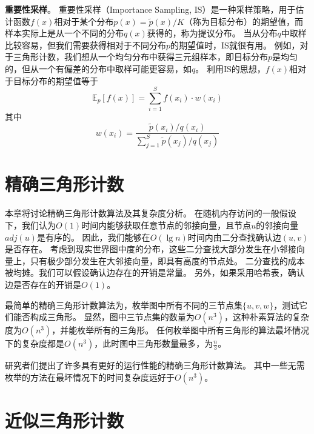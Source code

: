 \textbf{重要性采样}。
重要性采样（Importance Sampling, IS）是一种采样策略，用于估计函数$f(x)$相对于某个分布$p(x)=\tilde{p}(x)/K$（称为目标分布）的期望值，而样本实际上是从一个不同的分布$q(x)$获得的，称为提议分布。
当从分布$q$中取样比较容易，但我们需要获得相对于不同分布$p$的期望值时，IS就很有用。
例如，对于三角形计数，我们想从一个均匀分布中获得三元组样本，即目标分布$p$是均匀的，但从一个有偏差的分布中取样可能更容易，如$q$。
利用IS的思想，$f(x)$相对于目标分布的期望值等于
\begin{equation}
    \mathbb{E}_{p}[f(x)]=\sum_{i=1}^{S} f\left(x_{i}\right) \cdot w\left(x_{i}\right)
    \label{eq:IS}
\end{equation}
其中
\begin{equation}
    w\left(x_{i}\right)=\frac{\widetilde{p}\left(x_{i}\right) / q\left(x_{i}\right)}{\sum_{j=1}^{S} \tilde{p}\left(x_{j}\right) / q\left(x_{j}\right)}
\end{equation}


\chapter{精确三角形计数}
本章将讨论精确三角形计数算法及其复杂度分析。
在随机内存访问的一般假设下，我们认为$O(1)$时间内能够获取任意节点的邻接向量，且节点$u$的邻接向量$adj(u)$是有序的。
因此，我们能够在$O(\lg n)$时间内由二分查找确认边$(u,v)$是否存在。
考虑到现实世界图中度的分布，这些二分查找大部分发生在小邻接向量上，只有极少部分发生在大邻接向量，即具有高度的节点处。
二分查找的成本被均摊。我们可以假设确认边存在的开销是常量。
另外，如果采用哈希表，确认边是否存在的开销是$O(1)$。

最简单的精确三角形计数算法为，枚举图中所有不同的三节点集$\{u,v,w\}$，测试它们能否构成三角形。
显然，图中三节点集的数量为$O(n^{3})$，这种朴素算法的复杂度为$O(n^{3})$，并能枚举所有的三角形。
任何枚举图中所有三角形的算法最坏情况下的复杂度都是$O(n^{3})$，此时图中三角形数量最多，为$\frac{n}{3}$。

研究者们提出了许多具有更好的运行性能的精确三角形计数算法。
其中一些无需枚举的方法在最坏情况下的时间复杂度远好于$O(n^{3})$。


\chapter{近似三角形计数}


